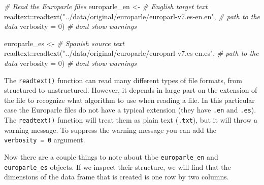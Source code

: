 \documentclass[
  letterpaper,
  DIV=11,
  numbers=noendperiod]{scrreport}
\newenvironment{Shaded}{\begin{snugshade}}{\end{snugshade}}
\newcommand{\AttributeTok}[1]{\textcolor[rgb]{0.00,0.00,0.00}{#1}}
\newcommand{\CommentTok}[1]{\textcolor[rgb]{0.00,0.00,0.00}{\textit{#1}}}
\newcommand{\DecValTok}[1]{\textcolor[rgb]{0.00,0.00,0.00}{#1}}
\newcommand{\FunctionTok}[1]{\textcolor[rgb]{0.00,0.00,0.00}{#1}}
\newcommand{\NormalTok}[1]{\textcolor[rgb]{0.00,0.00,0.00}{#1}}
\newcommand{\OtherTok}[1]{\textcolor[rgb]{0.00,0.00,0.00}{#1}}
\newcommand{\SpecialCharTok}[1]{\textcolor[rgb]{0.00,0.00,0.00}{#1}}
\newcommand{\StringTok}[1]{\textcolor[rgb]{0.00,0.00,0.00}{#1}}
\theoremstyle{definition}
\theoremstyle{remark}
\begin{document}
\begin{Shaded}
\begin{Highlighting}[]
\CommentTok{\# Read the Europarle files}
\NormalTok{europarle\_en }\OtherTok{\textless{}{-}}  \CommentTok{\# English target text}
\NormalTok{  readtext}\SpecialCharTok{::}\FunctionTok{readtext}\NormalTok{(}\StringTok{"../data/original/europarle/europarl{-}v7.es{-}en.en"}\NormalTok{, }\CommentTok{\# path to the data}
                     \AttributeTok{verbosity =} \DecValTok{0}\NormalTok{) }\CommentTok{\# don\textquotesingle{}t show warnings}

\NormalTok{europarle\_es }\OtherTok{\textless{}{-}} \CommentTok{\# Spanish source text}
\NormalTok{  readtext}\SpecialCharTok{::}\FunctionTok{readtext}\NormalTok{(}\StringTok{"../data/original/europarle/europarl{-}v7.es{-}en.es"}\NormalTok{, }\CommentTok{\# path to the data}
                     \AttributeTok{verbosity =} \DecValTok{0}\NormalTok{) }\CommentTok{\# don\textquotesingle{}t show warnings}
\end{Highlighting}
\end{Shaded}

\begin{tcolorbox}[enhanced jigsaw, breakable, arc=.35mm, opacityback=0, bottomrule=.15mm, colback=white, opacitybacktitle=0.6, colframe=quarto-callout-warning-color-frame, toptitle=1mm, colbacktitle=quarto-callout-warning-color!10!white, left=2mm, leftrule=.75mm, toprule=.15mm, title=\textcolor{quarto-callout-warning-color}{\faExclamationTriangle}\hspace{0.5em}{Tip}, bottomtitle=1mm, coltitle=black, titlerule=0mm, rightrule=.15mm]

The \texttt{readtext()} function can read many different types of file
formats, from structured to unstructured. However, it depends in large
part on the extension of the file to recognize what algorithm to use
when reading a file. In this particular case the Europarle files do not
have a typical extension (they have \texttt{.en} and \texttt{.es}). The
\texttt{readtext()} function will treat them as plain text
(\texttt{.txt}), but it will throw a warning message. To suppress the
warning message you can add the \texttt{verbosity\ =\ 0} argument.

\end{tcolorbox}

Now there are a couple things to note about thbe \texttt{europarle\_en}
and \texttt{europarle\_es} objects. If we inspect their structure, we
will find that the dimensions of the data frame that is created is one
row by two columns.
\end{document}

